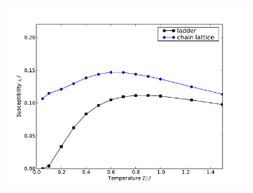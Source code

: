 \href{http://alps.comp-phys.org/vistrails/download.php?getvt=10&db=vistrails&host=alps.ethz.ch&port=3306&tag=&execute=True&showspreadsheetonly=True&embedWorkflow=False&version=166}{\includegraphics[width=8cm]{vistrails_images/alps.ethz.ch_vistrails_3306_10_166_pdf/None_None.pdf}
}